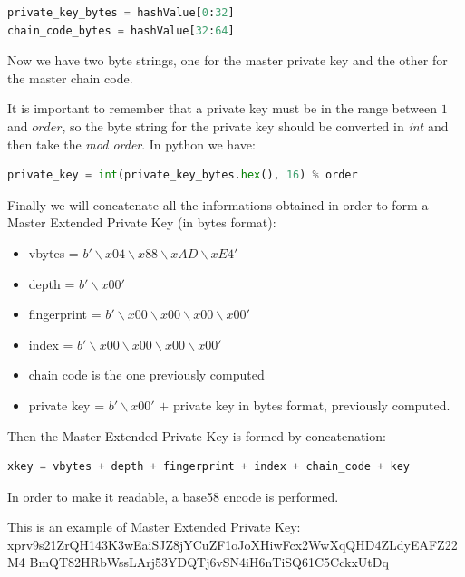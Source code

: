 \begin{lstlisting}[language=Python]
private_key_bytes = hashValue[0:32]
chain_code_bytes = hashValue[32:64]
\end{lstlisting}
\begin{flushleft}
	Now we have two byte strings, one for the master private key and the other for the master chain code.
\end{flushleft}
It is important to remember that a private key must be in the range between $1$ and $order$, so the byte string for the private key should be converted in \textit{int} and then take the \textit{mod order}. In python we have:

\begin{lstlisting}[language=Python]
private_key = int(private_key_bytes.hex(), 16) % order
\end{lstlisting}
\begin{flushleft}
	Finally we will concatenate all the informations obtained in order to form a Master Extended Private Key (in bytes format):
\end{flushleft}

\begin{itemize}
	\item vbytes = $b'\backslash x04\backslash x88\backslash xAD\backslash xE4'$
	\item depth = $b'\backslash x00'$
	\item fingerprint = $b'\backslash x00\backslash x00\backslash x00\backslash x00'$
	\item index = $b'\backslash x00\backslash x00\backslash x00\backslash x00'$
	\item chain code is the one previously computed
	\item private key = $b'\backslash x00'$ $+$ private key in bytes format, previously computed.
\end{itemize}
Then the Master Extended Private Key is formed by concatenation:

\begin{lstlisting}[language=Python]
xkey = vbytes + depth + fingerprint + index + chain_code + key
\end{lstlisting}
\begin{flushleft}
	In order to make it readable, a base58 encode is performed.
\end{flushleft}
This is an example of Master Extended Private Key: \\
xprv9s21ZrQH143K3wEaiSJZ8jYCuZF1oJoXHiwFcx2WwXqQHD4ZLdyEAFZ22M4 BmQT82HRbWssLArj53YDQTj6vSN4iH6nTiSQ61C5CckxUtDq

